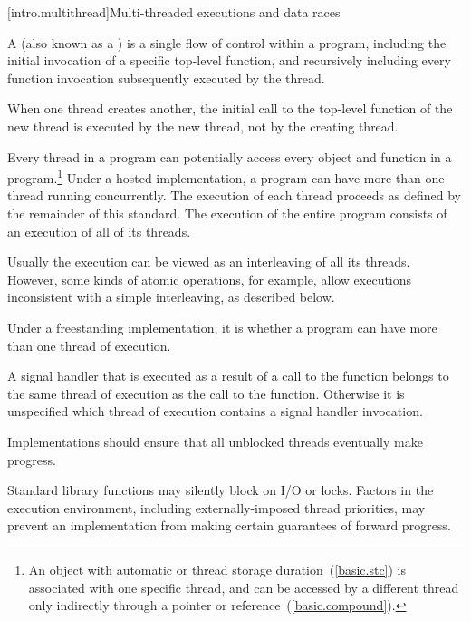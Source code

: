 [intro.multithread]{Multi-threaded executions and data races}

\pnum
{}%
%
A  (also known as a ) is a single flow of
control within a program, including the initial invocation of a specific
top-level function, and recursively including every function invocation
subsequently executed by the thread. \begin{note} When one thread creates another,
the initial call to the top-level function of the new thread is executed by the
new thread, not by the creating thread. \end{note} Every thread in a program can
potentially access every object and function in a program.\footnote{An object
with automatic or thread storage duration~(\ref{basic.stc}) is associated with
one specific thread, and can be accessed by a different thread only indirectly
through a pointer or reference~(\ref{basic.compound}).} Under a hosted
implementation, a \Cpp program can have more than one thread running
concurrently. The execution of each thread proceeds as defined by the remainder
of this standard. The execution of the entire program consists of an execution
of all of its threads. \begin{note} Usually the execution can be viewed as an
interleaving of all its threads. However, some kinds of atomic operations, for
example, allow executions inconsistent with a simple interleaving, as described
below. \end{note} Under a freestanding implementation, it is  whether a program can
have more than one thread of execution.

\pnum
A signal handler that is executed as a result of a call to the 
function belongs to the same thread of execution as the call to the
 function. Otherwise it is unspecified which thread of execution
contains a signal handler invocation.

\pnum
Implementations should ensure that all unblocked threads eventually make
progress. \begin{note} Standard library functions may silently block on I/O or
locks. Factors in the execution environment, including externally-imposed thread
priorities, may prevent an implementation from making certain guarantees of
forward progress. \end{note}


